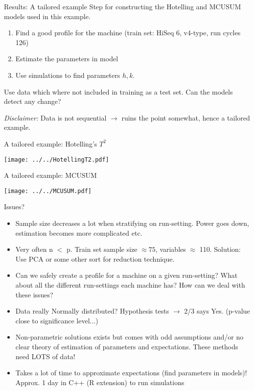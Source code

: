 \documentclass[11pt]{beamer}
\begin{document}
\begin{frame}{Results: A tailored example}
Step for constructing the Hotelling and MCUSUM models used in this example.
\begin{enumerate}
\item Find a good profile for the machine (train set: HiSeq 6, v4-type, run cycles 126)
\item Estimate the parameters in model 
\item Use simulations to find parameters $h,k$.
\end{enumerate}
Use data which where not included in training as a test set. Can the models detect any change?

\textit{Disclaimer:} Data is not sequential $\rightarrow$ ruins the point somewhat, hence a tailored example.
\end{frame}


\begin{frame}{A tailored example: Hotelling's $T^2$}
\begin{center}
 \texttt{[image: ../../HotellingT2.pdf]} 
\end{center}
\end{frame}

\begin{frame}{A tailored example: MCUSUM}
\begin{center}
\texttt{[image: ../../MCUSUM.pdf]}
\end{center}
\end{frame}

\begin{frame}{Issues?}
\begin{itemize}
\item Sample size decreases a lot when stratifying on run-setting. Power goes down, estimation becomes more complicated etc. 
\item Very often n $<$ p. Train set sample size $\approx 75$, variables $\approx$ 110. Solution: Use PCA or some other sort for reduction technique.
\item Can we safely create a profile for a machine on a given run-setting? What about all the different run-settings each machine has? How can we deal with these issues?
\item Data really Normally distributed? Hypothesis tests $\rightarrow$ 2/3 says Yes. (p-value close to significance level...)
\item Non-parametric solutions exists but comes with odd assumptions and/or no clear theory of estimation of parameters and expectations. These methods need LOTS of data!
\item Takes a lot of time to approximate expectations (find parameters in models)! Approx. 1 day in C++ (R extension) to run simulations
\end{itemize}
\end{frame}
\end{document}
